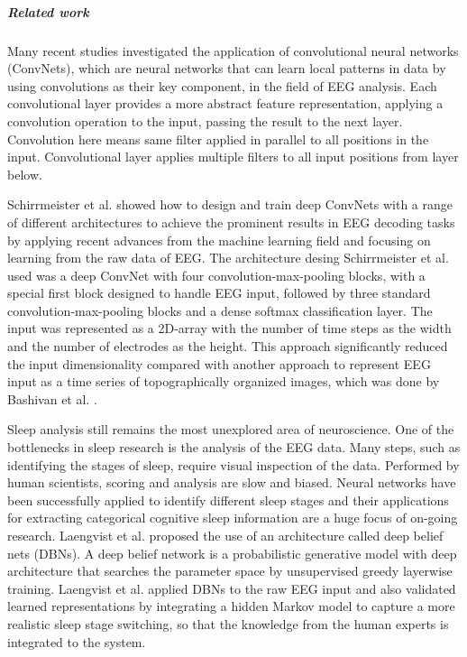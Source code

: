 \documentclass{article}
\begin{document}
\subparagraph{Related work} Many recent studies \cite{cecotti, shamwell,driver} investigated the application of convolutional neural networks (ConvNets), which are neural networks that can learn local patterns in data by using convolutions as their key component, in the field of EEG analysis. Each convolutional layer provides a more abstract feature representation, applying a convolution operation to the input, passing the result to the next layer. Convolution here means same filter applied in parallel to all positions in the input. Convolutional layer applies multiple filters to all input positions from layer below.

Schirrmeister et al. \cite{schirrmeister} showed how to design and train deep ConvNets with a range of different architectures to achieve the prominent results in EEG decoding tasks by applying recent advances from the machine learning field and focusing on learning from the raw data of EEG. The architecture desing Schirrmeister et al. used was a  deep ConvNet with four convolution-max-pooling blocks, with a special first block designed to handle EEG input, followed by three standard convolution-max-pooling blocks and a dense softmax classification layer. The input was represented as a 2D-array with the number of time steps as the width and the number of electrodes as the height. This approach significantly reduced the input dimensionality compared with another approach to represent EEG input as a time series of topographically organized images, which was done by Bashivan et al. \cite{learning_eeg_repr}.

Sleep analysis still remains the most unexplored area of neuroscience. One of the bottlenecks in sleep research is the analysis of the EEG data. Many steps, such as identifying the stages of sleep, require visual inspection of the data. Performed by human scientists, scoring and analysis are slow and biased. Neural networks have been successfully applied to identify different sleep stages and their applications for extracting categorical cognitive sleep information are a huge focus of on-going research. Laengvist et al. \cite{sleep} proposed the use of an architecture called deep belief nets (DBNs). A deep belief network is a probabilistic generative model with deep architecture that searches the parameter space by unsupervised greedy layerwise training. Laengvist et al. applied DBNs to the raw EEG input and also validated learned representations by integrating a hidden Markov model to capture a more realistic sleep stage switching, so that the knowledge from the human experts is integrated to the system.
\end{document}
